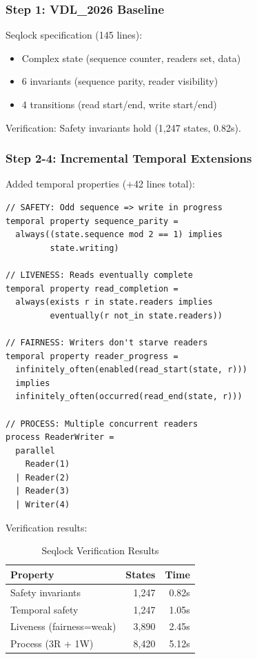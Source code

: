 \documentclass[conference]{IEEEtran}
\begin{document}
\subsubsection{Step 1: VDL\_2026 Baseline}

Seqlock specification (145 lines):
\begin{itemize}
\item Complex state (sequence counter, readers set, data)
\item 6 invariants (sequence parity, reader visibility)
\item 4 transitions (read start/end, write start/end)
\end{itemize}

Verification: Safety invariants hold (1,247 states, 0.82s).

\subsubsection{Step 2-4: Incremental Temporal Extensions}

Added temporal properties (+42 lines total):

\begin{lstlisting}[caption={Seqlock temporal properties}]
// SAFETY: Odd sequence => write in progress
temporal property sequence_parity =
  always((state.sequence mod 2 == 1) implies
         state.writing)

// LIVENESS: Reads eventually complete
temporal property read_completion =
  always(exists r in state.readers implies
         eventually(r not_in state.readers))

// FAIRNESS: Writers don't starve readers
temporal property reader_progress =
  infinitely_often(enabled(read_start(state, r)))
  implies
  infinitely_often(occurred(read_end(state, r)))

// PROCESS: Multiple concurrent readers
process ReaderWriter =
  parallel
    Reader(1)
  | Reader(2)
  | Reader(3)
  | Writer(4)
\end{lstlisting}

Verification results:

\begin{table}[h]
\centering
\caption{Seqlock Verification Results}
\begin{tabular}{|l|r|r|}
\hline
\textbf{Property} & \textbf{States} & \textbf{Time} \\
\hline
Safety invariants & 1,247 & 0.82s \\
Temporal safety & 1,247 & 1.05s \\
Liveness (fairness=weak) & 3,890 & 2.45s \\
Process (3R + 1W) & 8,420 & 5.12s \\
\hline
\end{tabular}
\end{table}
\end{document}
